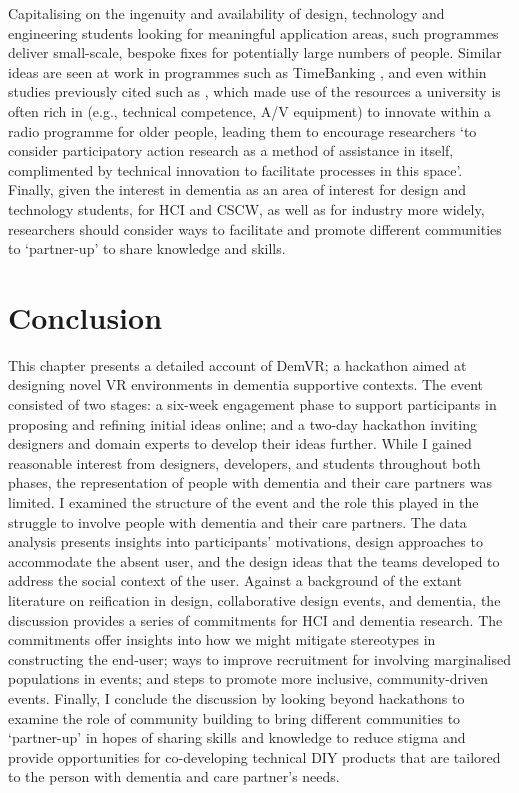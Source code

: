 Capitalising on the ingenuity and availability of design, technology and engineering students looking for meaningful application areas, such programmes deliver small-scale, bespoke fixes for potentially large numbers of people. Similar ideas are seen at work in programmes such as TimeBanking \citep{noauthor_hour_nodate}, and even within studies previously cited such as \cite{reuter_older_2019}, which made use of the resources a university is often rich in (e.g., technical competence, A/V equipment) to innovate within a radio programme for older people, leading them to encourage researchers ‘to consider participatory action research as a method of assistance in itself, complimented by technical innovation to facilitate processes in this space’. Finally, given the interest in dementia as an area of interest for design and technology students, for HCI and CSCW, as well as for industry more widely, researchers should consider ways to facilitate and promote different communities to ‘partner-up’ to share knowledge and skills. 

\section{Conclusion}
\label{sec:Conclusion}
This chapter presents a detailed account of DemVR; a hackathon aimed at designing novel VR environments in dementia supportive contexts. The event consisted of two stages: a six-week engagement phase to support participants in proposing and refining initial ideas online; and a two-day hackathon inviting designers and domain experts to develop their ideas further. While I gained reasonable interest from designers, developers, and students throughout both phases, the representation of people with dementia and their care partners was limited. I examined the structure of the event and the role this played in the struggle to involve people with dementia and their care partners. The data analysis presents insights into participants’ motivations, design approaches to accommodate the absent user, and the design ideas that the teams developed to address the social context of the user. Against a background of the extant literature on reification in design, collaborative design events, and dementia, the discussion provides a series of commitments for HCI and dementia research. The commitments offer insights into how we might mitigate stereotypes in constructing the end-user; ways to improve recruitment for involving marginalised populations in events; and steps to promote more inclusive, community-driven events. Finally, I conclude the discussion by looking beyond hackathons to examine the role of community building to bring different communities to ‘partner-up’ in hopes of sharing skills and knowledge to reduce stigma and provide opportunities for co-developing technical DIY products that are tailored to the person with dementia and care partner’s needs.

